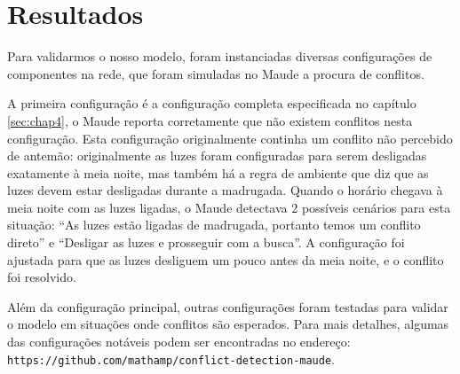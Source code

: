 \section{Resultados} \label{sec:chap6}

Para validarmos o nosso modelo, foram instanciadas diversas configurações de componentes na rede, que foram simuladas no Maude a procura de conflitos. 

A primeira configuração é a configuração completa especificada no capítulo \ref{sec:chap4}, o Maude reporta corretamente que não existem conflitos nesta configuração. Esta configuração originalmente continha um conflito não percebido de antemão: originalmente as luzes foram configuradas para serem desligadas exatamente à meia noite, mas também há a regra de ambiente que diz que as luzes devem estar desligadas durante a madrugada. Quando o horário chegava à meia noite com as luzes ligadas, o Maude detectava 2 possíveis cenários para esta situação: ``As luzes estão ligadas de madrugada, portanto temos um conflito direto'' e ``Desligar as luzes e prosseguir com a busca''. A configuração foi ajustada para que as luzes desliguem um pouco antes da meia noite, e o conflito foi resolvido.

Além da configuração principal, outras configurações foram testadas para validar o modelo em situações onde conflitos são esperados.
Para mais detalhes, algumas das configurações notáveis podem ser encontradas no endereço: \texttt{https://github.com/mathamp/conflict-detection-maude}.
